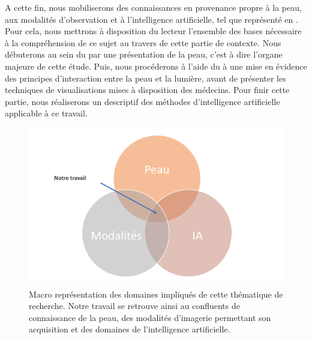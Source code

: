 A cette fin, nous mobiliserons des connaissances en provenance propre à la peau, aux modalités d'observation et à l'intelligence artificielle, tel que représenté en . Pour cela, nous mettrons à disposition du lecteur l'ensemble des bases nécessaire à la compréhension de ce sujet au travers de cette partie de contexte. Nous débuterons au sein du  par une présentation de la peau, c'est à dire l'organe majeure de cette étude. Puis, nous procéderons à l'aide du  à une mise en évidence des principes d'interaction entre la peau et la lumière, avant de présenter les techniques de visualisations mises à disposition des médecins. Pour finir cette partie, nous réaliserons un descriptif des méthodes d'intelligence artificielle applicable à ce travail.\par

\begin{figure}[H]
    \centering
    \includegraphics[width=\linewidth]{contents/ii_preamble_context/resources/scheme_our_work.pdf}
    \caption{Macro représentation des domaines impliqués de cette thématique de recherche. Notre travail se retrouve ainsi au confluents de connaissance de la peau, des modalités d'imagerie permettant son acquisition et des domaines de l'intelligence artificielle.}
    \label{fig:scheme_our_work}
\end{figure}\par